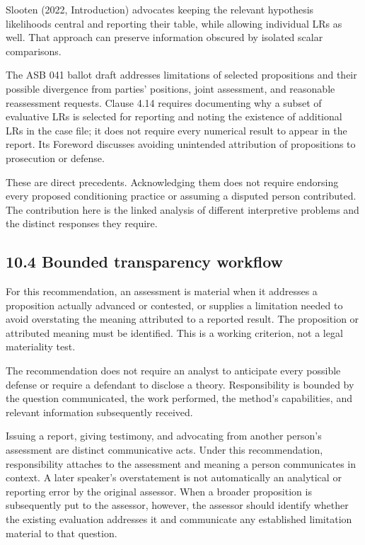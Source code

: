 \documentclass[
]{article}
\begin{document}
Slooten (2022, Introduction) advocates keeping the relevant hypothesis
likelihoods central and reporting their table, while allowing individual
LRs as well. That approach can preserve information obscured by isolated
scalar comparisons.

The ASB 041 ballot draft addresses limitations of selected propositions
and their possible divergence from parties' positions, joint assessment,
and reasonable reassessment requests. Clause 4.14 requires documenting
why a subset of evaluative LRs is selected for reporting and noting the
existence of additional LRs in the case file; it does not require every
numerical result to appear in the report. Its Foreword discusses
avoiding unintended attribution of propositions to prosecution or
defense.

These are direct precedents. Acknowledging them does not require
endorsing every proposed conditioning practice or assuming a disputed
person contributed. The contribution here is the linked analysis of
different interpretive problems and the distinct responses they require.

\subsection{10.4 Bounded transparency
workflow}\label{bounded-transparency-workflow}

For this recommendation, an assessment is material when it addresses a
proposition actually advanced or contested, or supplies a limitation
needed to avoid overstating the meaning attributed to a reported result.
The proposition or attributed meaning must be identified. This is a
working criterion, not a legal materiality test.

The recommendation does not require an analyst to anticipate every
possible defense or require a defendant to disclose a theory.
Responsibility is bounded by the question communicated, the work
performed, the method's capabilities, and relevant information
subsequently received.

Issuing a report, giving testimony, and advocating from another person's
assessment are distinct communicative acts. Under this recommendation,
responsibility attaches to the assessment and meaning a person
communicates in context. A later speaker's overstatement is not
automatically an analytical or reporting error by the original assessor.
When a broader proposition is subsequently put to the assessor, however,
the assessor should identify whether the existing evaluation addresses
it and communicate any established limitation material to that question.
\end{document}
